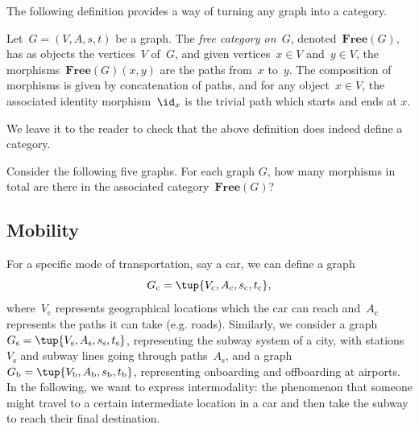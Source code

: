 The following definition provides a way of turning any graph into a category. 

\begin{ctdefinition}
Let~$G=(V,A,s,t)$ be a graph. The \emph{free category on~$G$}, denoted~$\mathbf{Free}(G)$, has as objects the vertices~$V$ of~$G$, and given vertices~$x\in V$ and~$y\in V$, the morphisms~$\mathbf{Free}(G)(x,y)$ are the paths from~$x$ to~$y$. 
The composition of morphisms is given by concatenation of paths, and for any object~$x \in V$, the associated identity morphism~$\id_x$ is the trivial path which starts and ends at $x$.
\end{ctdefinition}

We leave it to the reader to check that the above definition does indeed define a category. 

\begin{exercise}
Consider the following five graphs. For each graph $G$, how many morphisms in total are there in the associated category~$\mathbf{Free}(G)$?

    \begin{center}
    \end{center}
\end{exercise}

\subsection{Mobility}

For a specific mode of transportation, say a car, we can define a graph
\begin{equation*}
    G_\mathrm{c}=\tup{V_\mathrm{c},A_\mathrm{c},s_\mathrm{c},t_\mathrm{c}},
\end{equation*}
where~$V_\mathrm{c}$ represents geographical locations which the car can reach and~$A_\mathrm{c}$ represents the paths it can take (e.g. roads). Similarly, we consider a graph~$G_\mathrm{s}=\tup{V_\mathrm{s},A_\mathrm{s},s_\mathrm{s},t_\mathrm{s}}$, representing the subway system of a city, with stations~$V_\mathrm{s}$ and subway lines going through paths~$A_\mathrm{s}$, and a graph $G_\mathrm{b}=\tup{V_\mathrm{b},A_\mathrm{b},s_\mathrm{b},t_\mathrm{b}}$, representing onboarding and offboarding at airports. In the following, we want to express intermodality: the phenomenon that someone might travel to a certain intermediate location in a car and then take the subway to reach their final destination.

